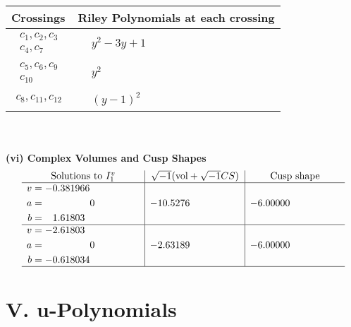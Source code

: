 \documentclass[1p]{elsarticle_modified}
\theoremstyle{definition}
\newcommand{\I}{\sqrt{-1}}
\begin{document}
\begin{tabular}{m{50pt}|m{274pt}}
Crossings & \hspace{64pt}Riley Polynomials at each crossing \\
\hline $$\begin{aligned}c_{1},c_{2},c_{3}\\c_{4},c_{7}\end{aligned}$$&$\begin{aligned}
&y^2-3 y+1
\end{aligned}$\\
\hline $$\begin{aligned}c_{5},c_{6},c_{9}\\c_{10}\end{aligned}$$&$\begin{aligned}
&y^2
\end{aligned}$\\
\hline $$\begin{aligned}c_{8},c_{11},c_{12}\end{aligned}$$&$\begin{aligned}
&(y-1)^2
\end{aligned}$\\
\hline
\end{tabular}\\~\\
\newpage\flushleft \textbf{(vi) Complex Volumes and Cusp Shapes}
$$\begin{array}{c|c|c}  
\text{Solutions to }I^v_{1}& \I (\text{vol} + \sqrt{-1}CS) & \text{Cusp shape}\\
 \hline 
\begin{aligned}
v &= -0.381966\phantom{ +0.000000I} \\
a &= \phantom{-0.000000 } 0 \\
b &= \phantom{-}1.61803\phantom{ +0.000000I}\end{aligned}
 & -10.5276\phantom{ +0.000000I} & -6.00000\phantom{ +0.000000I} \\ \hline\begin{aligned}
v &= -2.61803\phantom{ +0.000000I} \\
a &= \phantom{-0.000000 } 0 \\
b &= -0.618034\phantom{ +0.000000I}\end{aligned}
 & -2.63189\phantom{ +0.000000I} & -6.00000\phantom{ +0.000000I}\\
 \hline 
 \end{array}$$\newpage
\newpage\renewcommand{\arraystretch}{1}
\centering \section*{ V. u-Polynomials}
\end{document}
